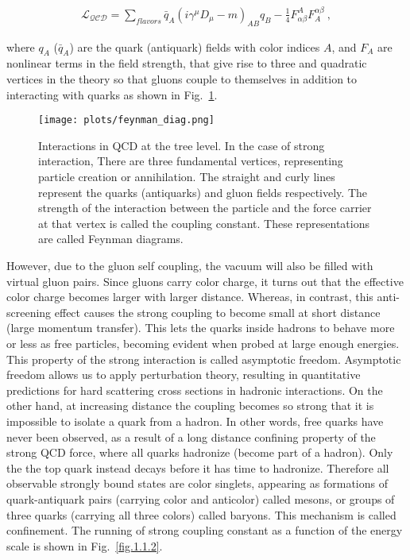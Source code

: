 \begin{equation}
    \label{eq.1.1}
    \begin{aligned}
        \mathcal{L_{QCD}}=\sum_{flavors}\bar{q}_{A}(i\gamma^{\mu}D_{\mu}-m)_{AB}q_{B}-\frac{1}{4}F^{A}_{\alpha\beta}F^{\alpha\beta}_{A}~,
    \end{aligned}
\end{equation}

\noindent where $q_A$ ($\bar{q}_{A}$) are the quark (antiquark) fields with color indices $A$, and $F_{A}$ are nonlinear terms in the field strength, that give rise to three and quadratic vertices in the theory so that gluons couple to themselves in addition to interacting with quarks as shown in Fig.~\ref{fig.1.1.1}.

\begin{figure}[H]
    \centering
        \texttt{[image: plots/feynman\_diag.png]}
        \caption{Interactions in QCD at the tree level. In the case of strong interaction, There are three fundamental vertices, representing particle creation or annihilation. The straight and curly lines represent the quarks (antiquarks) and gluon fields respectively. The strength of the interaction between the particle and the force carrier at that vertex is called the coupling constant. These representations are called Feynman diagrams.}
        \label{fig.1.1.1}
\end{figure}

However, due to the gluon self coupling, the vacuum will also be filled with virtual gluon pairs. Since gluons carry color charge, it turns out that the effective color charge becomes larger with larger distance. Whereas, in contrast, this anti-screening effect causes the strong coupling to become small at short distance (large momentum transfer). This lets the quarks inside hadrons to behave more or less as free particles, becoming evident when probed at large enough energies. This property of the strong interaction is called asymptotic freedom. Asymptotic freedom allows us to apply perturbation theory, resulting in quantitative predictions for hard scattering cross sections in hadronic interactions. On the other hand, at increasing distance the coupling becomes so strong that it is impossible to isolate a quark from a hadron. In other words, free quarks have never been observed, as a result of a long distance confining property of the strong QCD force, where all quarks hadronize (become part of a hadron). Only the the top quark instead decays before it has time to hadronize. Therefore all observable strongly bound states are color singlets, appearing as formations of quark-antiquark pairs (carrying color and anticolor) called mesons, or groups of three quarks (carrying all three colors) called baryons. This mechanism is called confinement. The running of strong coupling constant as a function of the energy scale is shown in Fig.~\ref{fig.1.1.2}.

